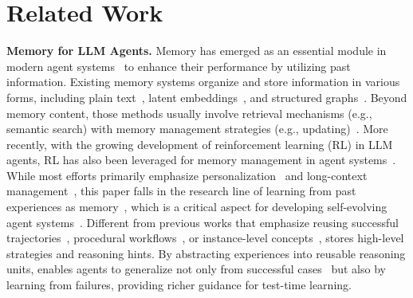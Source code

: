 \section{Related Work}
\label{sec: related_work}

\noindent\textbf{Memory for LLM Agents.}
Memory has emerged as an essential module in modern agent systems~\citep{zhang2024survey, hu2025memory, he2026memoryarenabenchmarkingagentmemory} to enhance their performance by utilizing past information. Existing memory systems organize and store information in various forms, including plain text~\citep{packer2023memgpt}, latent embeddings~\citep{wang2025m}, and structured graphs~\citep{xu2025mem, chhikara2025mem0, li2025memos}. Beyond memory content, those methods usually involve retrieval mechanisms (e.g., semantic search) with memory management strategies (e.g., updating)~\citep{tan-etal-2025-prospect, hu-etal-2025-hiagent}. More recently, with the growing development of reinforcement learning (RL) in LLM agents, RL has also been leveraged for memory management in agent systems~\citep{yu2025memagent, zhou2025mem1}.
While most efforts primarily emphasize personalization~\citep{zhang2025prime, zhong2024memorybank} and long-context management~\citep{maharana-etal-2024-evaluating, wu2025longmemeval, hu2025evaluating}, 
this paper falls in the research line of learning from past experiences as memory~\citep{zhao2024expel, su2025learnbyinteract}, which is a critical aspect for developing self-evolving agent systems~\citep{gao2025survey, liang2024self}. Different from previous works that emphasize reusing successful trajectories~\citep{zheng2024synapse, tang2025chemagent}, procedural workflows~\citep{wang2025agent, qian2024investigate, fang2025memp, liu-etal-2025-contextual, 10.5555/3692070.3693628}, or instance-level concepts~\citep{10.1145/3690624.3709171, suzgun2025dynamic, zhao2024expel}, \ours{} stores high-level strategies and reasoning hints. By abstracting experiences into reusable reasoning units, \ours{} enables agents to generalize not only from successful cases~\citep{zhao2024expel, alazraki2025no, fu2024autoguide} but also by learning from failures, providing richer guidance for test-time learning. 

